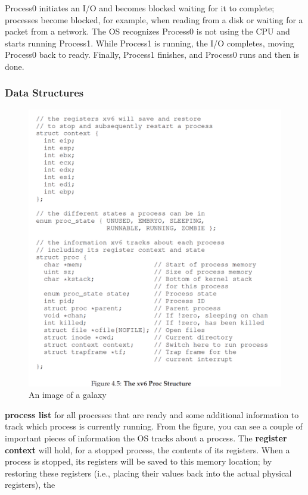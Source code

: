 \documentclass{article}
\begin{document}
Process0 initiates an I/O and becomes blocked waiting for it to complete; processes become blocked, for example, when reading from a disk or waiting for a packet from a network. The OS recognizes
Process0 is not using the CPU and starts running Process1. While Process1 is running, the I/O completes, moving Process0 back to ready. Finally, Process1 finishes, and Process0 runs and then is done.


\subsubsection{Data Structures}
\begin{figure}[H]
    \centering
    \includegraphics[width=13cm] {fig4.5.png}
    \caption{An image of a galaxy}
    \label{fig:galaxy}
\end{figure}
\textbf{process list} for all processes that are ready and some additional information
to track which process is currently running.
From the figure, you can see a couple of important pieces of information
the OS tracks about a process. The \textbf{register context} will hold, for a stopped process, the contents of its registers. When a process is stopped,
its registers will be saved to this memory location; by restoring these registers
(i.e., placing their values back into the actual physical registers), the
\end{document}
